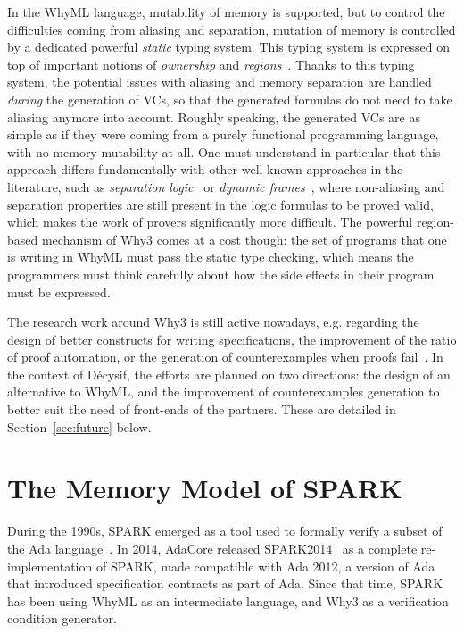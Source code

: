 \documentclass[a4paper,11pt]{article}
\begin{document}
In the WhyML language, mutability of memory is supported, but to control the
difficulties coming from aliasing and separation, mutation of memory is
controlled by a dedicated powerful \emph{static} typing system. This typing
system is expressed on top of important notions of \emph{ownership} and
\emph{regions}~\cite{gondelman16reg}. Thanks to this typing system, the
potential issues with aliasing and memory separation are handled \emph{during}
the generation of VCs, so that the generated formulas do not need to take
aliasing anymore into account. Roughly speaking, the generated VCs are as simple
as if they were coming from a purely functional programming language, with no
memory mutability at all. One must understand in particular that this approach
differs fundamentally with other well-known approaches in the literature, such
as \emph{separation logic}~\cite{Tuch_KN_07} or \emph{dynamic
  frames}~\cite{Smans09}, where non-aliasing and separation properties are still
present in the logic formulas to be proved valid, which makes the work of
provers significantly more difficult. The powerful region-based mechanism of
Why3 comes at a cost though: the set of programs that one is writing in WhyML
must pass the static type checking, which means the programmers must think carefully
about how the side effects in their program must be expressed.

The research work around Why3 is still active nowadays, e.g. regarding
the design of better constructs for writing specifications, the
improvement of the ratio of proof automation, or the generation of
counterexamples when proofs
fail~\cite{dailler18jlamp,becker21fide}. In the context of Décysif,
the efforts are planned on two directions: the design of an
alternative to WhyML, and the improvement of counterexamples
generation to better suit the need of front-ends of the partners. These
are detailed in Section~\ref{sec:future} below.

\section{The Memory Model of SPARK}
\label{sec:spark}


During the 1990s, SPARK emerged as a tool used to formally verify a subset of
the Ada language~\cite{carre90}. In 2014, AdaCore released
SPARK2014~\cite{mccormick15} as a complete
re-implementation of SPARK, made compatible with Ada 2012, a version of Ada that
introduced specification contracts as part of Ada. Since that time, SPARK has been
using WhyML as an intermediate language, and Why3 as a verification condition
generator.
\end{document}
